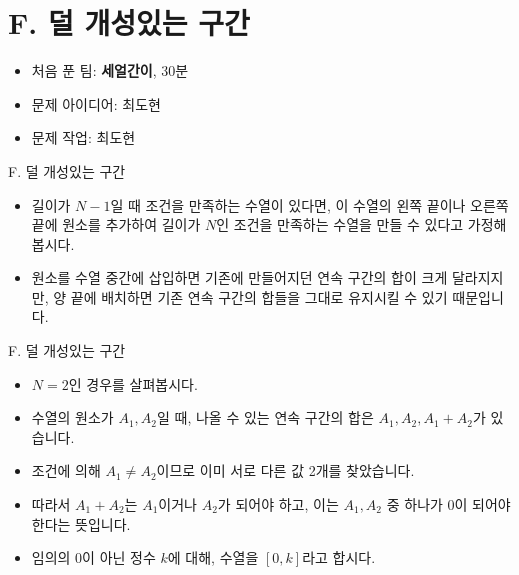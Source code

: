 \def\probno{F}
\def\probtitle{덜 개성있는 구간}

\section{\probno{}. \probtitle{}}

\begin{frame}
    \sectiontitle{\probno{}}{\probtitle{}}
    \begin{itemize}
        \item 처음 푼 팀: \textbf{세얼간이}, 30분
        \item 문제 아이디어: 최도현
        \item 문제 작업: 최도현
    \end{itemize}
\end{frame}

\begin{frame}{\probno{}. \probtitle{}}
    \begin{itemize}
        \item 길이가 $N-1$일 때 조건을 만족하는 수열이 있다면, 이 수열의 왼쪽 끝이나 오른쪽 끝에 원소를 추가하여 길이가 $N$인 조건을 만족하는 수열을 만들 수 있다고 가정해봅시다.
        \item 원소를 수열 중간에 삽입하면 기존에 만들어지던 연속 구간의 합이 크게 달라지지만, 양 끝에 배치하면 기존 연속 구간의 합들을 그대로 유지시킬 수 있기 때문입니다.
    \end{itemize}
\end{frame}

\begin{frame}{\probno{}. \probtitle{}}
    \begin{itemize}
        \item $N=2$인 경우를 살펴봅시다.
        \item 수열의 원소가 $A_1, A_2$일 때, 나올 수 있는 연속 구간의 합은 $A_1, A_2, A_1+A_2$가 있습니다.
        \item 조건에 의해 $A_1 \neq A_2$이므로 이미 서로 다른 값 2개를 찾았습니다.
        \item 따라서 $A_1+A_2$는 $A_1$이거나 $A_2$가 되어야 하고, 이는 $A_1, A_2$ 중 하나가 $0$이 되어야 한다는 뜻입니다.
        \item 임의의 0이 아닌 정수 $k$에 대해, 수열을 $[0, k]$라고 합시다.
    \end{itemize}
\end{frame}

